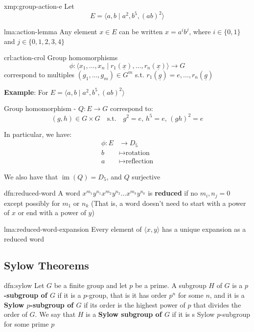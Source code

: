 \documentclass{article}
\DeclareMathOperator{\Ima}{im}
\begin{document}
\begin{xmp}{xmp:group-action-e}{}
    Let
    \[E = \langle a, b \mid a^{2}, b^{5}, (ab)^{2} \rangle\]
\end{xmp}

\begin{lma}[]{lma:action-lemma}{}
    Any element $x\in E$ can be written $x = a^{i}b^{j}$, where $i\in \{0, 1\}$ and $j\in \{0,1,2,3,4\}$
\end{lma}

\begin{crl}[]{crl:action-crol}{}
    Group homomorphisms
    \[\phi : \langle  x_{1},\dots,x_{n} \mid r_{1}(\underline{x}),\dots,r_{n}(\underline{x}) \rangle \to G\]
    correspond to multiples $(g_{1},\dots,g_{m})\in G^{m}$ s.t. $r_{1}(\underline{g}) = e,\dots,r_{n}(\underline{g})$
\end{crl}

\textbf{Example}: For $E = \langle a,b \mid a^{2},b^{5},(ab)^{2} \rangle$

Group homomorphism - $Q : E \to G$ correspond to:
\[(g,h)\in G \times G \quad\text{s.t.}\quad g^{2}=e,\,h^{5}=e,\,(gh)^{2}=e\]

In particular, we have:
\begin{align*}
    \phi : E &\to D_{5}\\
    b &\mapsto \text{rotation}\\
    a &\mapsto \text{reflection}
\end{align*}

We also have that $\Ima(Q) = D_{5}$, and $Q$ surjective


\begin{dfn}{dfn:reduced-word}{}
    A word $x^{m_{1}}y^{n_{1}}x^{m_{2}}y^{n_{2}}\dots x^{m_{k}}y^{n_{k}}$ is \textbf{reduced} if no $m_{i},n_{j} = 0$ except possibly for $m_{1}$ or $n_{k}$ (That is, a word doesn't need to start with a power of $x$ or end with a power of $y$)
\end{dfn}

\begin{lma}[]{lma:reduced-word-expansion}{}
    Every element of $\langle x, y \rangle$ has a unique expansion as a reduced word
\end{lma}

\subsection{Sylow Theorems}

\begin{dfn}{dfn:sylow}{}
    Let $G$ be a finite group and let $p$ be a prime. A subgroup $H$ of $G$ is a \textbf{$p$-subgroup of $G$} if it is a $p$-group, that is it has order $p^{n}$ for some $n$, and it is a \textbf{Sylow $p$-subgroup of $G$} if its order is the highest power of $p$ that divides the order of $G$. We say that $H$ is a \textbf{Sylow subgroup of $G$} if it is s Sylow $p$-subgroup for some prime $p$
\end{dfn}
\end{document}
